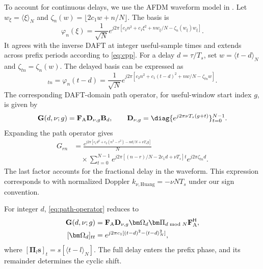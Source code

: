 To account for continuous delays, we use the AFDM waveform model in
\cite[Sec.~II]{huang2026}. Let $w_\xi=\langle\xi\rangle_N$ and
$\zeta_n(w)=\lfloor2c_1w+n/N\rfloor$. The basis is
\begin{equation}
 \varphi_n(\xi)=\frac{1}{\sqrt N}
 e^{j2\pi[c_2n^2+c_1\xi^2+nw_\xi/N-\zeta_n(w_\xi)w_\xi]}.
 \label{eq:continuous-waveform}
\end{equation}
It agrees with the inverse DAFT at integer useful-sample times and
extends across prefix periods according to \eqref{eq:cpp}.
For a delay $d=\tau/T_s$, set $w=\langle t-d\rangle_N$ and
$\zeta_{tn}=\zeta_n(w)$. The delayed basis can be expressed as
\begin{equation}
 [\mathbf B_d]_{tn}=\varphi_n(t-d)
 =\frac{1}{\sqrt N}
 e^{j2\pi[c_2n^2+c_1(t-d)^2+nw/N-\zeta_{tn}w]}.
 \label{eq:continuous-basis}
\end{equation}
The corresponding DAFT-domain path operator, for useful-window start
index $g$, is given by
\begin{equation}
 \mathbf G(d,\nu;g)=\mathbf F_{\rm A}\mathbf D_{\nu,g}\mathbf B_d,
 \qquad
 \mathbf D_{\nu,g}=\diag\{e^{j2\pi\nu T_s(g+t)}\}_{t=0}^{N-1}.
 \label{eq:path-operator}
\end{equation}
Expanding the path operator gives
\begin{equation}
 \begin{split}
 G_{rn}
 &=\frac{e^{j2\pi[c_1d^2+c_2(n^2-r^2)-nd/N+\nu T_sg]}}{N}\\
 &\quad\times\sum_{t=0}^{N-1}
 e^{j2\pi[(n-r)/N-2c_1d+\nu T_s]t}
 e^{j2\pi\zeta_{tn}d}.
 \end{split}
 \label{eq:path-entry-expansion}
\end{equation}
The last factor accounts for the fractional delay in the waveform.
This expression corresponds to \cite[eq.~(5)]{huang2026} with normalized
Doppler $k_{\nu,\mathrm{Huang}}=-\nu NT_s$ under our sign convention.

For integer $d$, \eqref{eq:path-operator} reduces to
\begin{align}
 \mathbf G(d,\nu;g)
 &=\mathbf F_{\rm A}\mathbf D_{\nu,g}\bm\Omega_d
   \bm\Pi_{d\bmod N}\mathbf F_{\rm A}^{\mathsf H},
 \label{eq:integer-operator}\\
 [\bm\Omega_d]_{tt}
 &=e^{j2\pi c_1[(t-d)^2-\langle t-d\rangle_N^2]},
 \label{eq:integer-prefix-phase}
\end{align}
where $[\bm\Pi_l\mathbf s]_t=s[\langle t-l\rangle_N]$.
The full delay enters the prefix phase, and its remainder determines
the cyclic shift.

